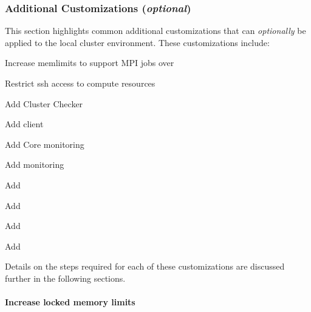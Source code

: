 \documentclass[letterpaper]{article}
\begin{document}



\subsubsection{Additional Customizations ({\em optional})} \label{sec:addl_customizations}

This section highlights common additional customizations that
can {\em optionally} be applied to the
local cluster environment. These customizations include:

\begin{itemize*}
\item Increase memlimits to support MPI jobs over \InfiniBand{}
\item Restrict ssh access to compute resources
\item Add Cluster Checker
\item Add \Lustre{} client
\item Add \Nagios{} Core monitoring
\item Add \Ganglia{} monitoring
\item Add \clustershell{}
\item Add \mrsh{}
\item Add \genders{}
\item Add \powerman{}
\end{itemize*}

\noindent Details on the steps required for each of these customizations are
discussed further in the following sections.

\paragraph{Increase locked memory limits}
\end{document}
